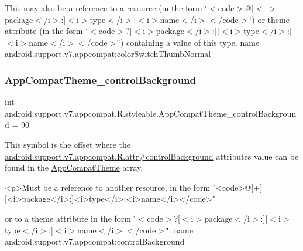 This may also be a reference to a resource (in the form \char`\"{}$<$code$>$@\mbox{[}$<$i$>$package$<$/i$>$\+:\mbox{]}$<$i$>$type$<$/i$>$\+:$<$i$>$name$<$/i$>$$<$/code$>$\char`\"{}) or theme attribute (in the form \char`\"{}$<$code$>$?\mbox{[}$<$i$>$package$<$/i$>$\+:\mbox{]}\mbox{[}$<$i$>$type$<$/i$>$\+:\mbox{]}$<$i$>$name$<$/i$>$$<$/code$>$\char`\"{}) containing a value of this type.  name android.\+support.\+v7.\+appcompat\+:color\+Switch\+Thumb\+Normal \mbox{\label{classandroid_1_1support_1_1v7_1_1appcompat_1_1R_1_1styleable_adbd4cb3df33f5d9a2b7c946af26dee6c}} 
\subsubsection{\texorpdfstring{App\+Compat\+Theme\+\_\+control\+Background}{AppCompatTheme\_controlBackground}}
{\footnotesize\ttfamily int android.\+support.\+v7.\+appcompat.\+R.\+styleable.\+App\+Compat\+Theme\+\_\+control\+Background = 90\hspace{0.3cm}{\ttfamily [static]}}

This symbol is the offset where the \hyperlink{classandroid_1_1support_1_1v7_1_1appcompat_1_1R_1_1attr_a901159731928d4261753b4ae386d60e3}{android.\+support.\+v7.\+appcompat.\+R.\+attr\#control\+Background} attribute\textquotesingle{}s value can be found in the \hyperlink{classandroid_1_1support_1_1v7_1_1appcompat_1_1R_1_1styleable_a5c42f89e8a410c323be34208d75c430b}{App\+Compat\+Theme} array.

\begin{DoxyVerb}      <p>Must be a reference to another resource, in the form "<code>@[+][<i>package</i>:]<i>type</i>:<i>name</i></code>"
\end{DoxyVerb}
 or to a theme attribute in the form \char`\"{}$<$code$>$?\mbox{[}$<$i$>$package$<$/i$>$\+:\mbox{]}\mbox{[}$<$i$>$type$<$/i$>$\+:\mbox{]}$<$i$>$name$<$/i$>$$<$/code$>$\char`\"{}.  name android.\+support.\+v7.\+appcompat\+:control\+Background \mbox{\label{classandroid_1_1support_1_1v7_1_1appcompat_1_1R_1_1styleable_a2ec375fd86ae1937bc7084ae55cb13ac}} 
